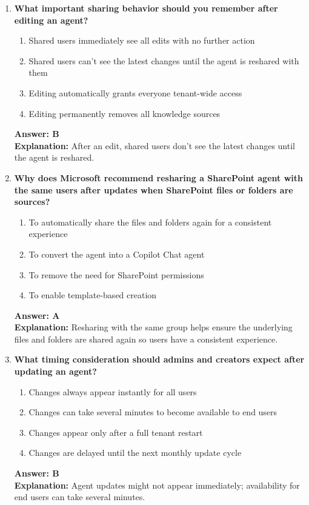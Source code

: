 \documentclass[10pt]{article}
\begin{document}
\begin{enumerate}[leftmargin=*]
\item \textbf{What important sharing behavior should you remember after editing an agent?}
\begin{enumerate}[label=\Alph*.]
  \item Shared users immediately see all edits with no further action
  \item Shared users can't see the latest changes until the agent is reshared with them
  \item Editing automatically grants everyone tenant-wide access
  \item Editing permanently removes all knowledge sources
\end{enumerate}
\textbf{Answer: B}\\
\textbf{Explanation:} After an edit, shared users don't see the latest changes until the agent is reshared.

\item \textbf{Why does Microsoft recommend resharing a SharePoint agent with the same users after updates when SharePoint files or folders are sources?}
\begin{enumerate}[label=\Alph*.]
  \item To automatically share the files and folders again for a consistent experience
  \item To convert the agent into a Copilot Chat agent
  \item To remove the need for SharePoint permissions
  \item To enable template-based creation
\end{enumerate}
\textbf{Answer: A}\\
\textbf{Explanation:} Resharing with the same group helps ensure the underlying files and folders are shared again so users have a consistent experience.

\item \textbf{What timing consideration should admins and creators expect after updating an agent?}
\begin{enumerate}[label=\Alph*.]
  \item Changes always appear instantly for all users
  \item Changes can take several minutes to become available to end users
  \item Changes appear only after a full tenant restart
  \item Changes are delayed until the next monthly update cycle
\end{enumerate}
\textbf{Answer: B}\\
\textbf{Explanation:} Agent updates might not appear immediately; availability for end users can take several minutes.


\end{enumerate}
\end{document}
